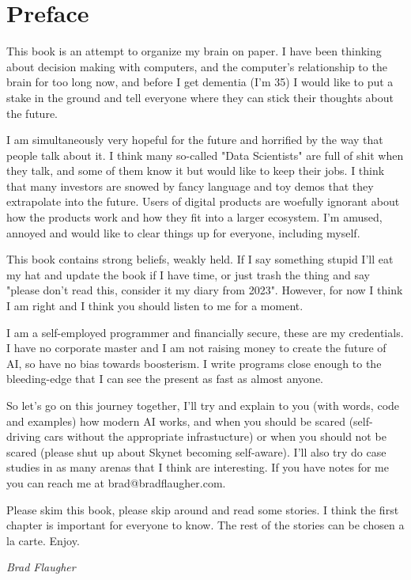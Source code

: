 \chapter*{Preface}

This book is an attempt to organize my brain on paper. I have been thinking about decision making with computers, and the computer's relationship to the brain for too long now, and before I get dementia (I'm 35) I would like to put a stake in the ground and tell everyone where they can stick their thoughts about the future. 

I am simultaneously very hopeful for the future and horrified by the way that people talk about it. I think many so-called "Data Scientists" are full of shit when they talk, and some of them know it but would like to keep their jobs. I think that many investors are snowed by fancy language and toy demos that they extrapolate into the future. Users of digital products are woefully ignorant about how the products work and how they fit into a larger ecosystem. I'm amused, annoyed and would like to clear things up for everyone, including myself.

This book contains strong beliefs, weakly held. If I say something stupid I'll eat my hat and update the book if I have time, or just trash the thing and say "please don't read this, consider it my diary from 2023". However, for now I think I am right and I think you should listen to me for a moment.

I am a self-employed programmer and financially secure, these are my credentials. I have no corporate master and I am not raising money to create the future of AI, so have no bias towards boosterism. I write programs close enough to the bleeding-edge that I can see the present as fast as almost anyone.

So let's go on this journey together, I'll try and explain to you (with words, code and examples) how modern AI works, and when you should be scared (self-driving cars without the appropriate infrastucture) or when you should not be scared (please shut up about Skynet becoming self-aware). I'll also try do case studies in as many arenas that I think are interesting. If you have notes for me you can reach me at brad@bradflaugher.com.

Please skim this book, please skip around and read some stories. I think the first chapter is important for everyone to know. The rest of the stories can be chosen a la carte. Enjoy.

\begin{flushright}
	\textit{Brad Flaugher}
\end{flushright}

